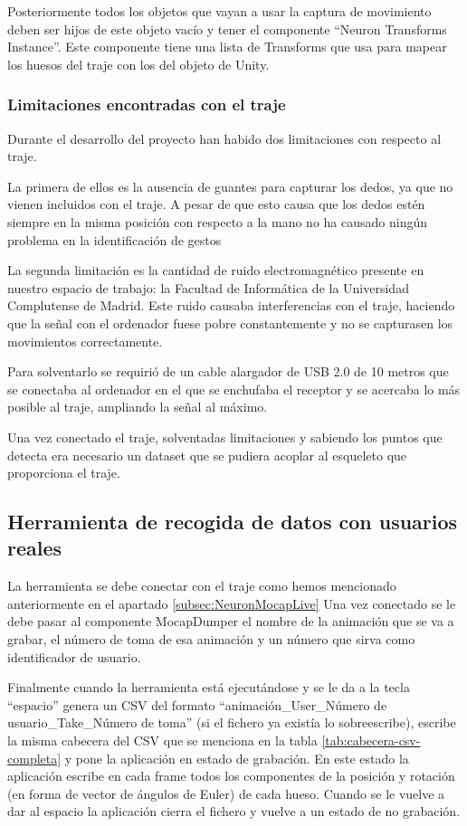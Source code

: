 Posteriormente todos los objetos que vayan a usar la captura de movimiento deben ser hijos de este objeto vacío y tener el componente ``Neuron Transforms Instance''.
Este componente tiene una lista de Transforms que usa para mapear los huesos del traje con los del objeto de Unity.

\subsubsection{Limitaciones encontradas con el traje}
Durante el desarrollo del proyecto han habido dos limitaciones con respecto al traje.

La primera de ellos es la ausencia de guantes para capturar los dedos, ya que no vienen incluidos con el traje.
A pesar de que esto causa que los dedos estén siempre en la misma posición con respecto a la mano no ha causado ningún problema en la identificación de gestos

La segunda limitación es la cantidad de ruido electromagnético presente en nuestro espacio de trabajo: la Facultad de Informática de la Universidad Complutense de Madrid.
Este ruido causaba interferencias con el traje, haciendo que la señal con el ordenador fuese pobre constantemente y no se capturasen los movimientos correctamente.

Para solventarlo se requirió de un cable alargador de USB 2.0 de 10 metros que se conectaba al ordenador en el que se enchufaba el receptor y se acercaba lo más posible al traje, ampliando la señal al máximo.

Una vez conectado el traje, solventadas limitaciones y sabiendo los puntos que detecta era necesario un dataset que se pudiera acoplar al esqueleto que proporciona el traje.

\subsection{Herramienta de recogida de datos con usuarios reales}
La herramienta se debe conectar con el traje como hemos mencionado anteriormente en el apartado \ref{subsec:NeuronMocapLive}
Una vez conectado se le debe pasar al componente MocapDumper el nombre de la animación que se va a grabar, el número de toma de esa animación y un número que sirva como identificador de usuario.

Finalmente cuando la herramienta está ejecutándose y se le da a la tecla ``espacio'' genera un CSV del formato ``animación\_User\_Número de usuario\_Take\_Número de toma'' (si el fichero ya existía lo sobreescribe), escribe la misma cabecera del CSV que se menciona en la tabla \ref{tab:cabecera-csv-completa} y pone la aplicación en estado de grabación.
En este estado la aplicación escribe en cada frame todos los componentes de la posición y rotación (en forma de vector de ángulos de Euler) de cada hueso.
Cuando se le vuelve a dar al espacio la aplicación cierra el fichero y vuelve a un estado de no grabación.


